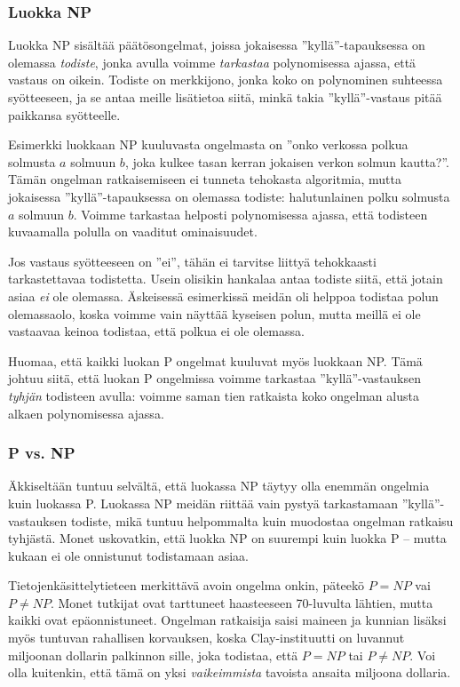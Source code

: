 \subsubsection{Luokka NP}

Luokka NP sisältää päätösongelmat, joissa jokaisessa
''kyllä''-tapauksessa on olemassa
\emph{todiste}, jonka avulla voimme
\emph{tarkastaa} polynomisessa ajassa, että vastaus on oikein.
Todiste on merkkijono, jonka koko on polynominen
suhteessa syötteeseen,
ja se antaa meille lisätietoa siitä,
minkä takia ''kyllä''-vastaus pitää paikkansa syötteelle.

Esimerkki luokkaan NP kuuluvasta ongelmasta on
''onko verkossa polkua solmusta $a$ solmuun $b$,
joka kulkee tasan kerran jokaisen verkon solmun kautta?''.
Tämän ongelman ratkaisemiseen ei tunneta tehokasta algoritmia,
mutta jokaisessa ''kyllä''-tapauksessa on olemassa todiste:
halutunlainen polku solmusta $a$ solmuun $b$.
Voimme tarkastaa helposti polynomisessa ajassa,
että todisteen kuvaamalla polulla on vaaditut ominaisuudet.

Jos vastaus syötteeseen on ''ei'', tähän ei tarvitse
liittyä tehokkaasti tarkastettavaa todistetta.
Usein olisikin hankalaa antaa todiste siitä, että jotain
asiaa \emph{ei} ole olemassa.
Äskeisessä esimerkissä meidän oli helppoa todistaa
polun olemassaolo, koska voimme vain näyttää kyseisen polun,
mutta meillä ei ole vastaavaa keinoa todistaa, että polkua ei ole olemassa.

Huomaa, että kaikki luokan P ongelmat kuuluvat myös
luokkaan NP. Tämä johtuu siitä, että luokan P ongelmissa
voimme tarkastaa ''kyllä''-vastauksen
\emph{tyhjän} todisteen avulla: voimme saman tien ratkaista
koko ongelman alusta alkaen polynomisessa ajassa.

\subsubsection{P vs. NP}

Äkkiseltään tuntuu selvältä, että luokassa NP täytyy olla
enemmän ongelmia kuin luokassa P.
Luokassa NP meidän riittää vain pystyä tarkastamaan ''kyllä''-vastauksen
todiste, mikä tuntuu helpommalta kuin muodostaa ongelman ratkaisu tyhjästä.
Monet uskovatkin, että luokka NP on suurempi kuin luokka P --
mutta kukaan ei ole onnistunut todistamaan asiaa.

Tietojenkäsittelytieteen merkittävä avoin ongelma onkin,
päteekö $P=NP$ vai $P \neq NP$.
Monet tutkijat ovat tarttuneet haasteeseen
70-luvulta lähtien, mutta kaikki ovat epäonnistuneet.
Ongelman ratkaisija saisi maineen ja kunnian lisäksi
myös tuntuvan rahallisen korvauksen, koska
Clay-instituutti on luvannut miljoonan dollarin palkinnon
sille, joka todistaa, että $P=NP$ tai $P \neq NP$.
Voi olla kuitenkin, että tämä on yksi \emph{vaikeimmista}
tavoista ansaita miljoona dollaria.

